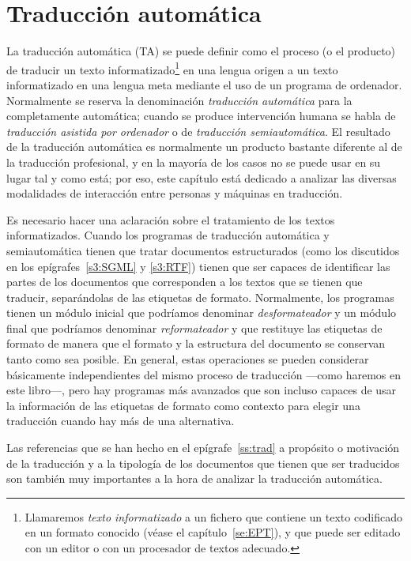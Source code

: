 \section{Traducción automática} \label{ss:TA} 

La traducción automática (TA) se puede definir como el proceso (o el producto) de traducir un texto informatizado\footnote{Llamaremos \emph{texto informatizado} a un fichero que contiene un texto codificado en un formato conocido (véase el capítulo~\ref{se:EPT}), y que puede ser editado con un editor o con un procesador de textos adecuado.} en una lengua origen a un texto informatizado en una lengua meta mediante el uso de un programa de ordenador. Normalmente se reserva la denominación \emph{traducción automática} para la completamente automática; cuando se produce intervención humana se habla de {\em traducción asistida por ordenador} o de \emph{traducción semiautomática}. El resultado de la traducción automática es normalmente un producto bastante diferente al de la traducción profesional, y en la mayoría de los casos no se puede usar en su lugar tal y como está; por eso, este capítulo está dedicado a analizar las diversas modalidades de interacción entre personas y máquinas en traducción. 

Es necesario hacer una aclaración sobre el tratamiento de los textos informatizados. Cuando los programas de traducción automática y semiautomática tienen que tratar documentos estructurados (como los discutidos en los epígrafes~\ref{s3:SGML} y \ref{s3:RTF}) tienen que ser capaces de identificar las partes de los documentos que corresponden a los textos que se tienen que traducir, separándolas de las etiquetas de formato. Normalmente, los programas tienen un módulo inicial que podríamos denominar \emph{desformateador} y un módulo final que podríamos denominar \emph{reformateador} y que restituye las etiquetas de formato de manera que el formato y la estructura del documento se conservan tanto como sea posible. En general, estas operaciones se pueden considerar básicamente independientes del mismo proceso de traducción ---como haremos en este libro---, pero hay programas más avanzados que son incluso capaces de usar la información de las etiquetas de formato como contexto para elegir una traducción cuando hay más de una alternativa. 

Las referencias que se han hecho en el epígrafe~\ref{ss:trad} a propósito o motivación de la traducción y a la tipología de los documentos que tienen que ser traducidos son también muy importantes a la hora de analizar la traducción automática. 

